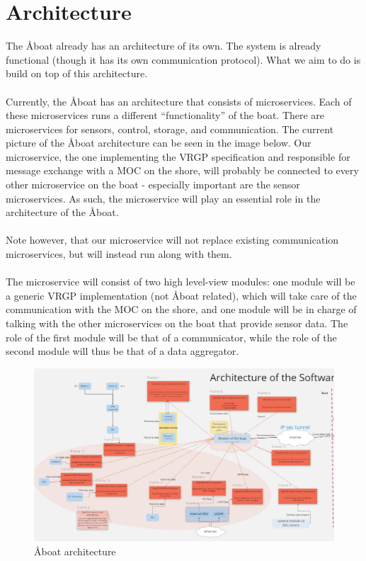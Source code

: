 \section{Architecture}\label{sec:architecture}

The Åboat already has an architecture of its own. The system is already functional (though it has its own communication protocol). What we aim to do is build on top of this architecture.
\\\\
Currently, the Åboat has an architecture that consists of microservices. Each of these microservices runs a different “functionality” of the boat. There are microservices for sensors, control, storage, and communication. The current picture of the Åboat architecture can be seen in the image below. Our microservice, the one implementing the VRGP specification and responsible for message exchange with a MOC on the shore, will probably be connected to every other microservice on the boat - especially important are the sensor microservices. As such, the microservice will play an essential role in the architecture of the Åboat.
\\\\
Note however, that our microservice will not replace existing communication microservices, but will instead run along with them.
\\\\
The microservice will consist of two high level-view modules: one module will be a generic VRGP implementation (not Åboat related), which will take care of the communication with the MOC on the shore, and one module will be in charge of talking with the other microservices on the boat that provide sensor data. The role of the first module will be that of a communicator, while the role of the second module will thus be that of a data aggregator.

\begin{figure}[ht]
	\centering
	\includegraphics[width=\linewidth]{img/aboat-architecture}
	\caption{Åboat architecture}
	\label{fig:aboat-architecture}
\end{figure}

